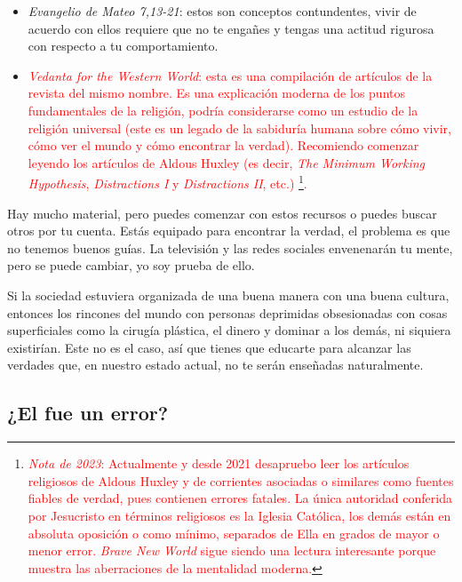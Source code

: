 \documentclass[12pt]{article}
\begin{document}
	\begin{itemize}

	\item \textit{Evangelio de Mateo 7,13-21}:
	estos son conceptos contundentes, vivir de acuerdo con ellos requiere
	que no te engañes y tengas una actitud rigurosa con respecto a tu
	comportamiento.

	\item \textcolor{red}{\textit{Vedanta for the Western World}: esta
	es una compilación de artículos de la revista del mismo nombre. Es una
	explicación moderna de los puntos fundamentales de la religión,
	podría considerarse como un estudio de la religión universal (este es un
	legado de la sabiduría humana sobre cómo vivir, cómo ver el mundo y cómo
	encontrar la verdad). Recomiendo comenzar leyendo los artículos de
	Aldous Huxley (es decir, \textit{The Minimum Working Hypothesis},
	\textit{Distractions I} y \textit{Distractions II}, etc.)
	\footnote{\textcolor{red}{
		\textit{Nota de 2023}: Actualmente y desde 2021 desapruebo leer
			los artículos
	religiosos de
	Aldous Huxley y de corrientes asociadas o similares como fuentes
	fiables de verdad, pues contienen errores fatales. La única autoridad
	conferida por Jesucristo en términos religiosos es la Iglesia
	Católica, los demás  están en absoluta oposición o
	como mínimo, separados de Ella en grados de mayor o menor error.
	\textit{Brave New World} sigue siendo una lectura interesante porque
	muestra las aberraciones de la mentalidad moderna.}}.}
	\end{itemize}

	Hay mucho material, pero puedes comenzar con estos recursos o puedes
	buscar otros por tu cuenta. Estás equipado para encontrar la verdad, el
	problema es que no tenemos buenos guías. La televisión y las redes
	sociales envenenarán tu mente, pero se puede cambiar, yo soy prueba de
	ello.

	Si la sociedad estuviera organizada de una buena manera con una buena
	cultura, entonces los rincones del mundo con personas deprimidas
	obsesionadas con cosas superficiales como la cirugía plástica, el dinero
	y dominar a los demás, ni siquiera existirían. Este no es el caso, así
	que tienes que educarte para alcanzar las verdades que, en nuestro
	estado actual, no te serán enseñadas naturalmente.

	\newpage

	\subsection{¿El  fue un error?}
\end{document}
